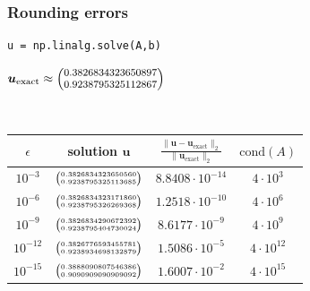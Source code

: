\documentclass{beamer}
\begin{document}
\begin{frame}[fragile]
\frametitle{Rounding errors}

\begin{minipage}{0.45\linewidth}
\begin{lstlisting}
u = np.linalg.solve(A,b)
\end{lstlisting}
\end{minipage}
\hfill
\begin{minipage}{0.45\linewidth}
$\boldsymbol{u}_{\text{exact}} 
\approx 
{\footnotesize%
\begin{pmatrix}
0.3826834323650897\\0.9238795325112867
\end{pmatrix}}$
\end{minipage}\\
 \begin{center}
  \renewcommand{\arraystretch}{1.5}
\begin{tabular}{cccc}  
  \hline
$\epsilon$ & solution $\boldsymbol{u}$ & $\frac{\|\boldsymbol{u}-\boldsymbol{u}_{\text{exact}}\|_2}{\|\boldsymbol{u}_{\text{exact}}\|_2}$ & $\text{cond}(A)$\\
\hline\hline
  $10^{-3}$ & ${\tiny\begin{pmatrix}0.3826834323650560 \\ 0.9238795325113685\end{pmatrix}}$ &  $8.8408\cdot 10^{-14}$  & $4\cdot 10^3$ \\
  $10^{-6}$ & ${\tiny\begin{pmatrix}0.3826834323171860 \\0.9238795326269368\end{pmatrix}}$ & $1.2518\cdot 10^{-10}$ & $4\cdot 10^6$ \\
  $10^{-9}$ & ${\tiny\begin{pmatrix}0.3826834290672392 \\0.9238795404730024\end{pmatrix}}$ & $8.6177\cdot 10^{-9}$ & $4\cdot 10^9$ \\
  $10^{-12}$ & ${\tiny\begin{pmatrix}0.3826776593455781 \\ 0.9238934698132879\end{pmatrix}}$ & $1.5086\cdot10^{-5}$ & $4\cdot 10^{12}$ \\
  $10^{-15}$ & ${\tiny\begin{pmatrix}0.3888090807546386 \\0.9090909090909092\end{pmatrix}}$ & $1.6007\cdot10^{-2}$ & $4\cdot 10^{15}$ \\

\end{tabular}
\end{center}
\end{frame}
\end{document}
